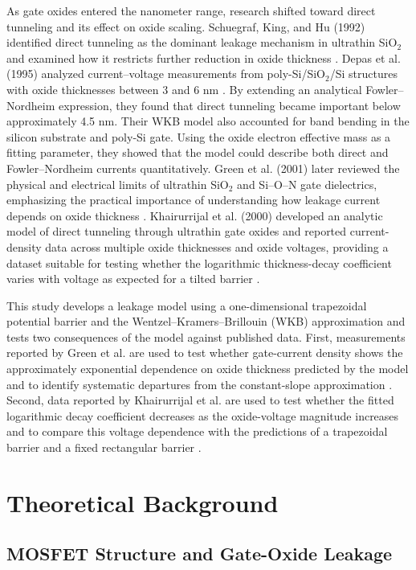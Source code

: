 \documentclass[12pt]{article}
\begin{document}
As gate oxides entered the nanometer range, research shifted toward direct tunneling and its effect on oxide scaling. Schuegraf, King, and Hu (1992) identified direct tunneling as the dominant leakage mechanism in ultrathin SiO$_2$ and examined how it restricts further reduction in oxide thickness \cite{schuegraf1992}. Depas et al. (1995) analyzed current--voltage measurements from poly-Si/SiO$_2$/Si structures with oxide thicknesses between 3 and 6 nm \cite{depas1995}. By extending an analytical Fowler--Nordheim expression, they found that direct tunneling became important below approximately 4.5 nm. Their WKB model also accounted for band bending in the silicon substrate and poly-Si gate. Using the oxide electron effective mass as a fitting parameter, they showed that the model could describe both direct and Fowler--Nordheim currents quantitatively. Green et al. (2001) later reviewed the physical and electrical limits of ultrathin SiO$_2$ and Si--O--N gate dielectrics, emphasizing the practical importance of understanding how leakage current depends on oxide thickness \cite{green2001review}. Khairurrijal et al. (2000) developed an analytic model of direct tunneling through ultrathin gate oxides and reported current-density data across multiple oxide thicknesses and oxide voltages, providing a dataset suitable for testing whether the logarithmic thickness-decay coefficient varies with voltage as expected for a tilted barrier \cite{khairurrijal2000}.

This study develops a leakage model using a one-dimensional trapezoidal potential barrier and the Wentzel--Kramers--Brillouin (WKB) approximation and tests two consequences of the model against published data. First, measurements reported by Green et al. are used to test whether gate-current density shows the approximately exponential dependence on oxide thickness predicted by the model and to identify systematic departures from the constant-slope approximation \cite{green1999limits}. Second, data reported by Khairurrijal et al. are used to test whether the fitted logarithmic decay coefficient decreases as the oxide-voltage magnitude increases and to compare this voltage dependence with the predictions of a trapezoidal barrier and a fixed rectangular barrier \cite{khairurrijal2000}.

\section{Theoretical Background}

\subsection{MOSFET Structure and Gate-Oxide Leakage}
\end{document}
